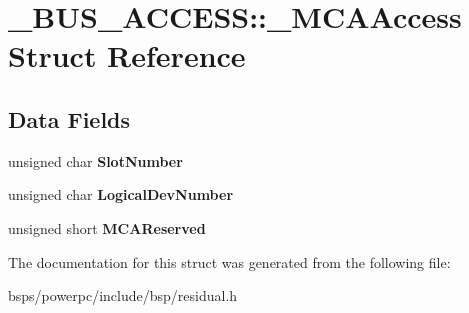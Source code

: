 \hypertarget{struct__BUS__ACCESS_1_1__MCAAccess}{}\section{\+\_\+\+B\+U\+S\+\_\+\+A\+C\+C\+E\+SS\+::\+\_\+\+M\+C\+A\+Access Struct Reference}
\label{struct__BUS__ACCESS_1_1__MCAAccess}
\subsection*{Data Fields}
\begin{DoxyCompactItemize}
\item 
\mbox{\label{struct__BUS__ACCESS_1_1__MCAAccess_a9d67858217faedaf1d4d082d8cd5d804}} 
unsigned char {\bfseries Slot\+Number}
\item 
\mbox{\label{struct__BUS__ACCESS_1_1__MCAAccess_a27361b78ff878f64c6dd55b01ad12a03}} 
unsigned char {\bfseries Logical\+Dev\+Number}
\item 
\mbox{\label{struct__BUS__ACCESS_1_1__MCAAccess_a49aff52fd911d2d81b1583019b558964}} 
unsigned short {\bfseries M\+C\+A\+Reserved}
\end{DoxyCompactItemize}


The documentation for this struct was generated from the following file\+:\begin{DoxyCompactItemize}
\item 
bsps/powerpc/include/bsp/residual.\+h\end{DoxyCompactItemize}
